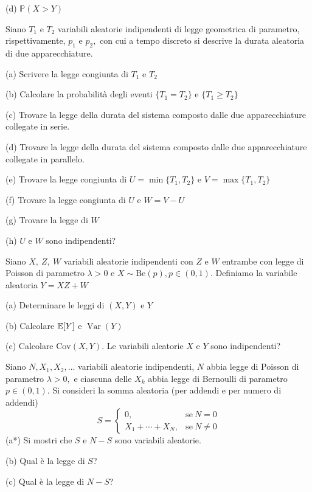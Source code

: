 (d) $\mathbb{P} (X >Y)$
\Esercizio{}

Siano $T_{1}$ e $T_{2}$ variabili aleatorie indipendenti di legge geometrica di parametro, rispettivamente, $p_{1}$ e $p_{2} ,$ con cui a tempo discreto si descrive la durata aleatoria di due apparecchiature.

(a) Scrivere la legge congiunta di $T_{1}$ e $T_{2}$

(b) Calcolare la probabilità degli eventi $\{T_{1} =T_{2}\}$ e $\{T_{1} \geq T_{2}\}$

(c) Trovare la legge della durata del sistema composto dalle due apparecchiature collegate in serie.

(d) Trovare la legge della durata del sistema composto dalle due apparecchiature collegate in parallelo.

(e) Trovare la legge congiunta di $U=\min\{T_{1} ,T_{2}\}$ e $V=\max\{T_{1} ,T_{2}\}$

(f) Trovare la legge congiunta di $U$ e $W=V-U$

(g) Trovare la legge di $W$

(h) $U$ e $W$ sono indipendenti?
\Esercizio{}

Siano $X,\ Z,\ W$ variabili aleatorie indipendenti con $Z$ e $W$ entrambe con legge di Poisson di parametro $\lambda  >0$ e $X\sim \mathrm{Be} (p),p\in (0,1)$. Definiamo la variabile aleatoria $Y=XZ+W$

(a) Determinare le leggi di $(X,Y)$ e $Y$

(b) Calcolare $\mathbb{E} [Y]$ e $\operatorname{Var} (Y)$

(c) Calcolare $\mathrm{Cov} (X,Y)$. Le variabili aleatorie $X$ e $Y$ sono indipendenti?
\Esercizio{}

Siano $N,X_{1} ,X_{2} ,\dots $ variabili aleatorie indipendenti, $N$ abbia legge di Poisson di parametro $\lambda  >0,$ e ciascuna delle $X_{k}$ abbia legge di Bernoulli di parametro $p\in (0,1).$ Si consideri la somma aleatoria (per addendi e per numero di addendi)
\begin{equation*}
S=\begin{cases}
0, & \text{se} \ N=0\\
X_{1} +\cdots +X_{N} , & \text{se} \ N\neq 0
\end{cases}
\end{equation*}
(a*) Si mostri che $S$ e $N-S$ sono variabili aleatorie.

(b) Qual è la legge di $S$?

(c) Qual è la legge di $N-S$?

